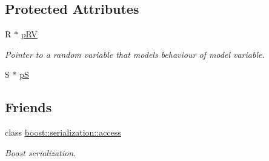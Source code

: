 \subsection*{Protected Attributes}
\begin{DoxyCompactItemize}
\item 
R $\ast$ \hyperlink{class_go_s_u_m_1_1_t_model_variable_ae48bc1204051b96adc0ecff50edea231}{p\-R\-V}
\begin{DoxyCompactList}\small\item\em Pointer to a random variable that models behaviour of model variable. \end{DoxyCompactList}\item 
S $\ast$ \hyperlink{class_go_s_u_m_1_1_t_model_variable_a7c0daa5e00c6ea510079dd5bf78916bc}{p\-S}
\end{DoxyCompactItemize}
\subsection*{Friends}
\begin{DoxyCompactItemize}
\item 
class \hyperlink{class_go_s_u_m_1_1_t_model_variable_ac98d07dd8f7b70e16ccb9a01abf56b9c}{boost\-::serialization\-::access}
\begin{DoxyCompactList}\small\item\em Boost serialization. \end{DoxyCompactList}\end{DoxyCompactItemize}


